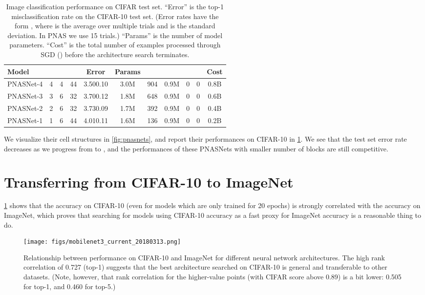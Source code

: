 \documentclass[runningheads]{llncs}
\begin{document}
\begin{table}[h!]
\begin{center}
\begin{tabular}{l c c c|c c|c c c c c}
\toprule
Model &  &  &  & Error & Params &  &  &  &  & Cost
\\
\midrule
PNASNet-4 & 4 & 4 & 44 &  3.500.10 & 3.0M & 904 & 0.9M & 0 & 0 & 0.8B \\
PNASNet-3 & 3 & 6 & 32  & 3.700.12 & 1.8M & 648 & 0.9M & 0 & 0 & 0.6B \\
PNASNet-2 & 2 & 6 & 32 & 3.730.09 & 1.7M & 392 & 0.9M & 0 & 0 & 0.4B \\
PNASNet-1 & 1 & 6 & 44  & 4.010.11 & 1.6M & 136 & 0.9M & 0 & 0 & 0.2B \\
\bottomrule
\end{tabular}
\end{center}
\caption{Image classification performance on CIFAR test set.
``Error'' is the top-1 misclassification rate on the CIFAR-10 test set.
(Error rates have the form ,
where  is the average over multiple trials and  is the standard deviation. In PNAS we use 15 trials.)
``Params'' is the  number of model parameters.
``Cost'' is the total number of examples processed through SGD () before the architecture search terminates.}
\label{tab:cifar}
\end{table}

We visualize their cell structures in \cref{fig:pnasnets}, and report their performances on CIFAR-10 in \cref{tab:cifar}.
We see that the test set error rate decreases as we progress from  to , and the performances of these PNASNets with smaller number of blocks are still competitive.

\section{Transferring from CIFAR-10 to ImageNet}

\cref{fig:cifar-vs-imagenet} shows that the accuracy on CIFAR-10 (even for models which are only trained for 20 epochs) is strongly correlated with the accuracy on ImageNet, which proves that searching for models using CIFAR-10 accuracy as a fast proxy for ImageNet accuracy is a reasonable thing to do.


\begin{figure}[H]
    \centering
    \texttt{[image: figs/mobilenet3\_current\_20180313.png]}
    \caption{
    Relationship between performance on CIFAR-10 and ImageNet for different neural network architectures. The high rank correlation of 0.727 (top-1) suggests that the best architecture searched on CIFAR-10 is general and transferable to other datasets.
(Note, however, that rank correlation for the higher-value points (with CIFAR score above 0.89)
    is a bit lower: 0.505 for top-1, and 0.460 for top-5.)
    }
    \label{fig:cifar-vs-imagenet}
\end{figure} 
\end{document}
